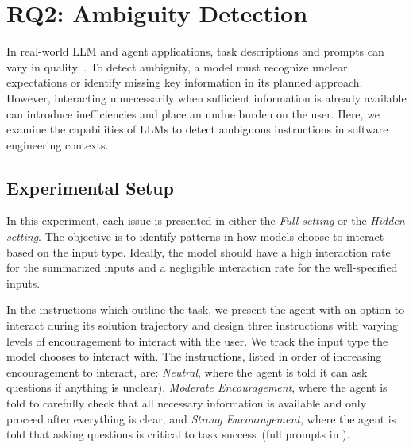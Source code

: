 \section{RQ2: Ambiguity Detection}
\label{sec:AmbiguityDetection}
In real-world LLM and agent applications, task descriptions and prompts can vary in quality~\cite{SWE_Bench_Verified}.
To detect ambiguity, a model must recognize unclear expectations or identify missing key information in its planned approach. However, interacting unnecessarily when sufficient information is already available can introduce inefficiencies and place an undue burden on the user. Here, we examine the capabilities of LLMs to detect ambiguous instructions in software engineering contexts.

\subsection{Experimental Setup}
In this experiment, each issue is presented in either the \textit{Full setting} or the \textit{Hidden setting}. The objective is to identify patterns in how models choose to interact based on the input type. Ideally, the model should have a high interaction rate for the summarized inputs and a negligible interaction rate for the well-specified inputs. 

In the instructions which outline the task, we present the agent with an option to interact during its solution trajectory and design three instructions with varying levels of encouragement to interact with the user. We track the input type the model chooses to interact with. The instructions, listed in order of increasing encouragement to interact, are: \textit{Neutral}, where the agent is told it can ask questions if anything is unclear), \textit{Moderate Encouragement}, where the agent is told to carefully check that all necessary information is available and only proceed after everything is clear, and \textit{Strong Encouragement}, where the agent is told that asking questions is critical to task success~(full prompts in ). 

